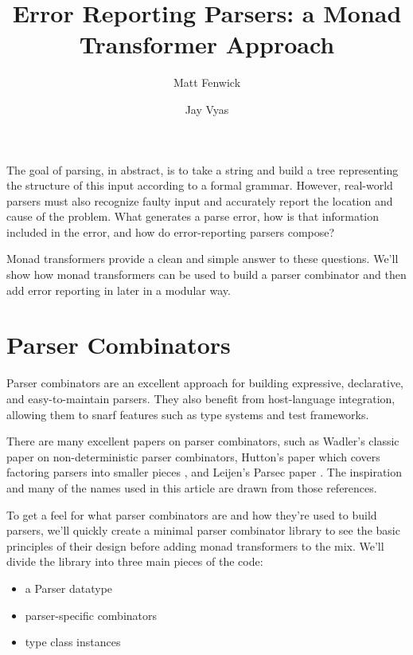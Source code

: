 \documentclass{tmr}
\title{Error Reporting Parsers:  a Monad Transformer Approach}
\author{Matt Fenwick\email{mfenwick100@gmail.com}}
\author{Jay Vyas\email{jayunit100@gmail.com}}
\begin{document}
\begin{introduction}


The goal of parsing, in abstract, is to take a string and build a tree
representing the structure of this input according to a formal grammar.
However, real-world parsers must also recognize faulty input and
accurately report the location and cause of the problem.  What generates
a parse error, how is that information included in the error, and how do
error-reporting parsers compose?

Monad transformers provide a clean and simple answer to these questions.
We'll show how monad transformers can be used to build a parser combinator
and then add error reporting in later in a modular way.

\end{introduction}




\section{Parser Combinators}


Parser combinators are an excellent approach for building expressive, 
declarative, and easy-to-maintain parsers.  They also benefit from host-language
integration, allowing them to snarf features such as type systems and test 
frameworks. 

There are many excellent papers on parser combinators, such
as Wadler's classic paper \cite{wadler} on non-deterministic parser combinators, 
Hutton's paper which covers factoring parsers into smaller pieces \cite{hutton}, 
and Leijen's Parsec paper \cite{leijen}.
The inspiration and many of the names used in this article are drawn 
from those references.

To get a feel for what parser combinators are and how they're used to
build parsers, we'll quickly create a minimal parser combinator library to see
the basic principles of their design before adding monad transformers to
the mix.  We'll divide the library into three main pieces of the code:

\begin{itemize}
 \item a Parser datatype
 \item parser-specific combinators
 \item type class instances
\end{itemize}
\end{document}
